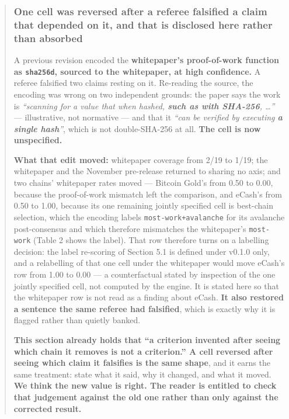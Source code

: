 \documentclass[
]{article}
\begin{document}
\begin{quote}
\mbox{}%
\subsubsection{One cell was reversed after a referee falsified a claim
that depended on it, and that is disclosed here rather than
absorbed}\label{one-cell-was-reversed-after-a-referee-falsified-a-claim-that-depended-on-it-and-that-is-disclosed-here-rather-than-absorbed}

A previous revision encoded the \textbf{whitepaper's proof-of-work
function as \texttt{sha256d}, sourced to the whitepaper, at high
confidence.} A referee falsified two claims resting on it. Re-reading
the source, the encoding was wrong on two independent grounds: the paper
says the work is \emph{``scanning for a value that when hashed,
\textbf{such as with SHA-256}, \ldots{}''} --- illustrative, not
normative --- and that it \emph{``can be verified by executing \textbf{a
single hash}''}, which is not double-SHA-256 at all. \textbf{The cell is
now unspecified.}

\textbf{What that edit moved:} whitepaper coverage from 2/19 to 1/19;
the whitepaper and the November pre-release returned to sharing no axis;
and two chains' whitepaper rates moved --- Bitcoin Gold's from 0.50 to
0.00, because the proof-of-work mismatch left the comparison, and
eCash's from 0.50 to 1.00, because its one remaining jointly specified
cell is best-chain selection, which the encoding labels
\texttt{most-work+avalanche} for its avalanche post-consensus and which
therefore mismatches the whitepaper's \texttt{most-work} (Table 2 shows
the label). That row therefore turns on a labelling decision: the label
re-scoring of Section 5.1 is defined under v0.1.0 only, and a
relabelling of that one cell under the whitepaper would move eCash's row
from 1.00 to 0.00 --- a counterfactual stated by inspection of the one
jointly specified cell, not computed by the engine. It is stated here so
that the whitepaper row is not read as a finding about eCash. \textbf{It
also restored a sentence the same referee had falsified}, which is
exactly why it is flagged rather than quietly banked.

\textbf{This section already holds that ``a criterion invented after
seeing which chain it removes is not a criterion.'' A cell reversed
after seeing which claim it falsifies is the same shape}, and it earns
the same treatment: state what it said, why it changed, and what it
moved. \textbf{We think the new value is right. The reader is entitled
to check that judgement against the old one rather than only against the
corrected result.}
\end{quote}
\end{document}
